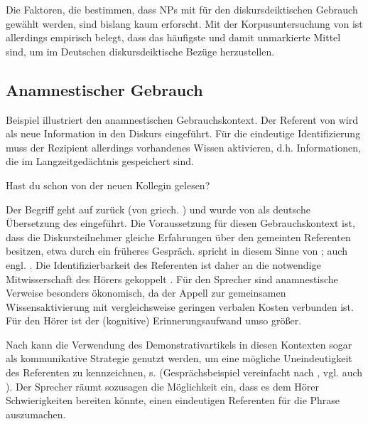 Die Faktoren, die bestimmen, dass NPs  mit  für den diskursdeiktischen  Gebrauch gewählt werden, sind bislang kaum erforscht. Mit der Korpusuntersuchung  von \textcite{Consten2007} ist allerdings empirisch belegt, dass  das häufigste und damit unmarkierte Mittel sind, um im Deutschen diskursdeiktische  Bezüge herzustellen.

\subsection{Anamnestischer Gebrauch}\label{sec:amnamnestisch}

Beispiel  illustriert den anamnestischen  Gebrauchskontext. Der Referent von   wird als neue Information  in den Diskurs eingeführt. Für die eindeutige Identifizierung muss der Rezipient allerdings vorhandenes Wissen aktivieren, d.h. Informationen, die im Langzeitgedächtnis gespeichert sind.

\begin{exe}
	\ex \label{ex:anamn} Hast du schon  von der neuen Kollegin gelesen?  
\end{exe}

Der Begriff   geht auf \textcite{Buhler1934} zurück (von griech.  ) und wurde von \textcite{Himmelmann1997} als deutsche Übersetzung des  \parencite{Himmelmann1996,Diessel1999}  eingeführt.
Die Voraussetzung für diesen Gebrauchskontext ist, dass die Diskursteilnehmer gleiche Erfahrungen über den gemeinten Referenten besitzen, etwa durch ein früheres Gespräch. \textcite[44]{Bisle-Muller1991} spricht in diesem Sinne von ; auch engl.  \parencite[106]{Diessel1999}. Die Identifizierbarkeit des Referenten ist daher an die notwendige Mitwisserschaft des Hörers gekoppelt \parencite[72]{Szczepaniak2011a}. Für den Sprecher sind anamnestische  Verweise besonders ökonomisch, da der Appell zur gemeinsamen Wissensaktivierung mit vergleichsweise geringen verbalen Kosten verbunden ist. Für den Hörer ist der (kognitive) Erinnerungsaufwand umso größer.

Nach \textcite[79--80]{Bisle-Muller1991} kann die Verwendung des Demonstrativartikels  in diesen Kontexten sogar als kommunikative Strategie genutzt werden, um eine mögliche Uneindeutigkeit des Referenten zu kennzeichnen, s.  (Gesprächsbeispiel vereinfacht nach \citealt[637]{Auer1984}, vgl. auch \citealt[58]{Himmelmann1997}). Der Sprecher räumt sozusagen die Möglichkeit ein, dass es dem Hörer Schwierigkeiten bereiten könnte, einen eindeutigen Referenten für die Phrase   auszumachen. 

